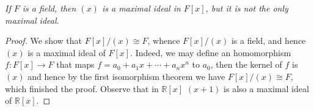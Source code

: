 \begin{problem}\em
If $F$ is a field, then $(x)$ is a maximal ideal in $F[x]$, but it is not the only maximal ideal.
\end{problem}
\begin{proof}
We show that $F[x]/(x)\cong F$, whence $F[x]/(x)$ is a field, and hence $(x)$ is a maximal ideal of $F[x]$. Indeed, we may define an homomorphism $f:F[x]\to F$ that maps $f=a_0+a_1x+\cdots+a_nx^n$ to $a_0$, then the kernel of $f$ is $(x)$ and hence by the first isomorphism theorem we have $F[x]/(x)\cong F$, which finished the proof. Observe that in $\mathbb{R}[x]$ $(x+1)$ is also a maximal ideal of $\mathbb{R}[x]$.
\end{proof}